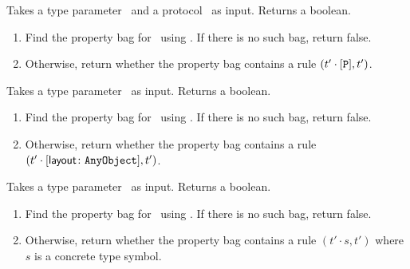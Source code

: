 \documentclass[../generics]{subfiles}
\begin{document}
\begin{algorithm}\label{alg:requires protocol}
Takes a type parameter \tT\ and a protocol \tP\ as input. Returns a boolean.
\begin{enumerate}
\item Find the property bag for \tT\ using . If there is no such bag, return false.
\item Otherwise, return whether the property bag contains a rule $(t' \cdot [\texttt{P}], t')$.
\end{enumerate}
\end{algorithm}

\begin{algorithm}\label{alg:requires class}
Takes a type parameter \tT\ as input. Returns a boolean.
\begin{enumerate}
\item Find the property bag for \tT\ using . If there is no such bag, return false.
\item Otherwise, return whether the property bag contains a rule $(t' \cdot [\mathsf{layout}\colon\texttt{AnyObject}], t')$.
\end{enumerate}
\end{algorithm}

\begin{algorithm}\label{alg:is concrete type}
Takes a type parameter \tT\ as input. Returns a boolean.
\begin{enumerate}
\item Find the property bag for \tT\ using . If there is no such bag, return false.
\item Otherwise, return whether the property bag contains a rule $(t' \cdot s, t')$ where $s$ is a concrete type symbol.
\end{enumerate}
\end{algorithm}
\end{document}

